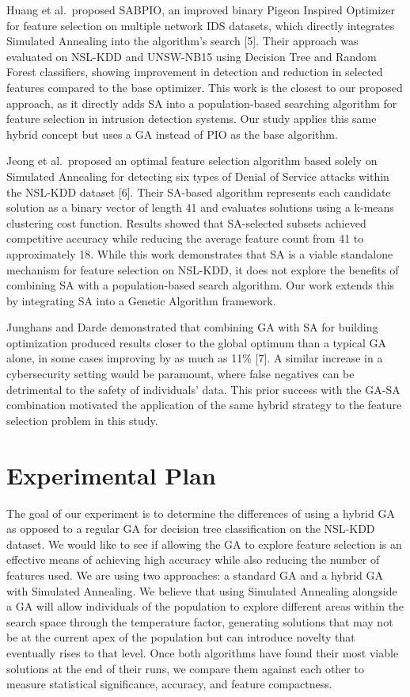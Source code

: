 \documentclass[letterpaper]{article} %
\begin{document}
Huang et al.\ proposed SABPIO, an improved binary Pigeon Inspired Optimizer for feature selection on multiple network IDS datasets, which directly integrates Simulated Annealing into the algorithm's search [5]. Their approach was evaluated on NSL-KDD and UNSW-NB15 using Decision Tree and Random Forest classifiers, showing improvement in detection and reduction in selected features compared to the base optimizer. This work is the closest to our proposed approach, as it directly adds SA into a population-based searching algorithm for feature selection in intrusion detection systems. Our study applies this same hybrid concept but uses a GA instead of PIO as the base algorithm.

Jeong et al.\ proposed an optimal feature selection algorithm based solely on Simulated Annealing for detecting six types of Denial of Service attacks within the NSL-KDD dataset [6]. Their SA-based algorithm represents each candidate solution as a binary vector of length 41 and evaluates solutions using a k-means clustering cost function. Results showed that SA-selected subsets achieved competitive accuracy while reducing the average feature count from 41 to approximately 18. While this work demonstrates that SA is a viable standalone mechanism for feature selection on NSL-KDD, it does not explore the benefits of combining SA with a population-based search algorithm. Our work extends this by integrating SA into a Genetic Algorithm framework.

Junghans and Darde demonstrated that combining GA with SA for building optimization produced results closer to the global optimum than a typical GA alone, in some cases improving by as much as 11\% [7]. A similar increase in a cybersecurity setting would be paramount, where false negatives can be detrimental to the safety of individuals' data. This prior success with the GA-SA combination motivated the application of the same hybrid strategy to the feature selection problem in this study.

\section{Experimental Plan}

The goal of our experiment is to determine the differences of using a hybrid GA as opposed to a regular GA for decision tree classification on the NSL-KDD dataset. We would like to see if allowing the GA to explore feature selection is an effective means of achieving high accuracy while also reducing the number of features used. We are using two approaches: a standard GA and a hybrid GA with Simulated Annealing. We believe that using Simulated Annealing alongside a GA will allow individuals of the population to explore different areas within the search space through the temperature factor, generating solutions that may not be at the current apex of the population but can introduce novelty that eventually rises to that level. Once both algorithms have found their most viable solutions at the end of their runs, we compare them against each other to measure statistical significance, accuracy, and feature compactness.
\end{document}
